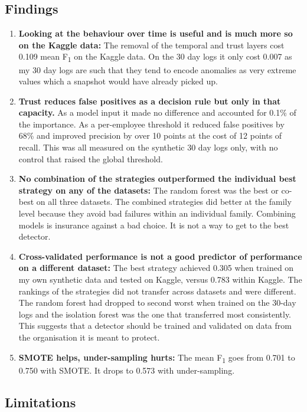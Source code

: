 \documentclass[a4paper,12pt]{article}
\begin{document}
\subsection{Findings}
\label{sec:11.1}

\begin{enumerate}
  \item \textbf{Looking at the behaviour over time is useful and is much more so on the Kaggle data:} The removal of the temporal and trust layers cost 0.109 mean F\textsubscript{1} on the Kaggle data. On the 30 day logs it only cost 0.007 as my 30 day logs are such that they tend to encode anomalies as very extreme values which a snapshot would have already picked up.
  \item \textbf{Trust reduces false positives as a decision rule but only in that capacity.} As a model input it made no difference and accounted for 0.1\% of the importance. As a per-employee threshold it reduced false positives by 68\% and improved precision by over 10 points at the cost of 12 points of recall. This was all measured on the synthetic 30 day logs only, with no control that raised the global threshold.
  \item \textbf{No combination of the strategies outperformed the individual best strategy on any of the datasets:} The random forest was the best or co-best on all three datasets. The combined strategies did better at the family level because they avoid bad failures within an individual family. Combining models is insurance against a bad choice. It is not a way to get to the best detector.
  \item \textbf{Cross-validated performance is not a good predictor of performance on a different dataset:} The best strategy achieved 0.305 when trained on my own synthetic data and tested on Kaggle, versus 0.783 within Kaggle. The rankings of the strategies did not transfer across datasets and were different. The random forest had dropped to second worst when trained on the 30-day logs and the isolation forest was the one that transferred most consistently. This suggests that a detector should be trained and validated on data from the organisation it is meant to protect.
  \item \textbf{SMOTE helps, under-sampling hurts:} The mean F\textsubscript{1} goes from 0.701 to 0.750 with SMOTE. It drops to 0.573 with under-sampling.
\end{enumerate}
\subsection{Limitations}
\label{sec:11.2}
\end{document}
